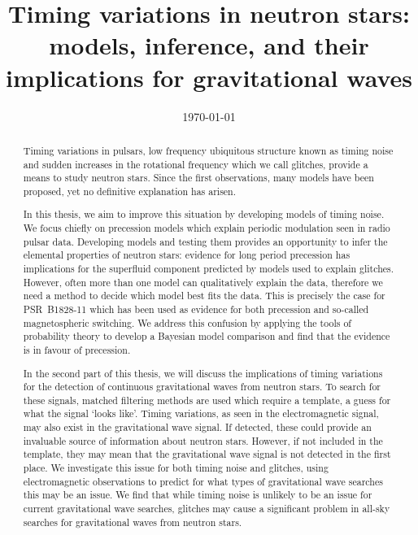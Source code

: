 \documentclass[twoside, 11pt]{thesis}
\begin{document}
\def\biblio{}

\frontmatter
\title      {Timing variations in neutron stars: models, inference, and their
             implications for gravitational waves}
\date       {\today}
\subject    {}
\keywords   {}
\maketitle

\begin{abstract}

Timing variations in pulsars, low frequency ubiquitous structure known as
timing noise and sudden increases in the rotational frequency which we call
glitches, provide a means to study neutron stars. Since the first observations,
many models have been proposed, yet no definitive explanation has arisen.

In this thesis, we aim to improve this situation by developing models of timing
noise. We focus chiefly on precession models which explain periodic modulation
seen in radio pulsar data.  Developing models and testing them provides an
opportunity to infer the elemental properties of neutron stars: evidence for
long period precession has implications for the superfluid component predicted
by models used to explain glitches. However, often more than one model can
qualitatively explain the data, therefore we need a method to decide which
model best fits the data. This is precisely the case for PSR~B1828-11 which has
been used as evidence for both precession and so-called magnetospheric
switching. We address this confusion by applying the tools of probability
theory to develop a Bayesian model comparison and find that the evidence is in
favour of precession.

In the second part of this thesis, we will discuss the implications of timing
variations for the detection of continuous gravitational waves from neutron
stars. To search for these signals, matched filtering methods are used which
require a template, a guess for what the signal `looks like'. Timing
variations, as seen in the electromagnetic signal, may also exist in the
gravitational wave signal. If detected, these could provide an invaluable
source of information about neutron stars. However, if not included in the
template, they may mean that the gravitational wave signal is not detected in
the first place. We investigate this issue for both timing noise and glitches,
using electromagnetic observations to predict for what types of gravitational
wave searches this may be an issue. We find that while timing noise is unlikely
to be an issue for current gravitational wave searches, glitches may cause a
significant problem in all-sky searches for gravitational waves from neutron
stars.

\end{abstract}
\end{document}
